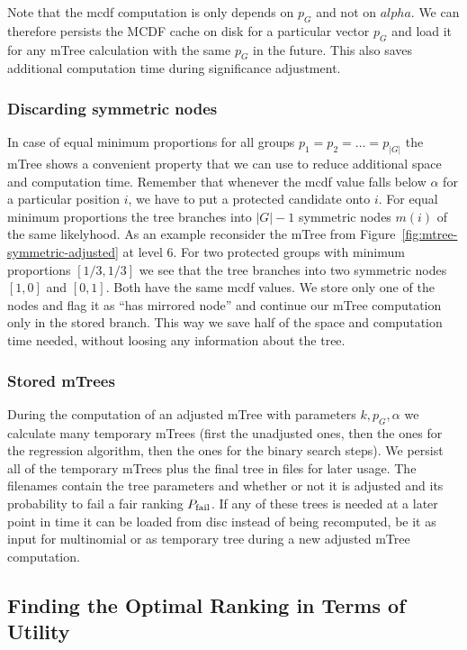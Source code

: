 Note that the mcdf computation is only depends on $p_G$ and not on $alpha$. 
%
We can therefore persists the MCDF cache on disk for a particular vector $p_G$ and load it for any mTree calculation with the same $p_G$ in the future.
%
This also saves additional computation time during significance adjustment.

\subsubsection{Discarding symmetric nodes}
\label{subsubsec:discarding-symmetric-nodes}
In case of equal minimum proportions for all groups $p_1 = p_2 = \ldots = p_|G|$ the mTree shows a convenient property that we can use to reduce additional space and computation time. 
%
Remember that whenever the mcdf value falls below $\alpha$ for a particular position $i$, we have to put a protected candidate onto $i$. 
%
For equal minimum proportions the tree branches into $|G| - 1$ symmetric nodes $m(i)$ of the same likelyhood.
%
As an example reconsider the mTree from Figure~\ref{fig:mtree-symmetric-adjusted} at level 6. 
%
For two protected groups with minimum proportions $[1/3, 1/3]$ we see that the tree branches into two symmetric nodes $[1, 0]$ and $[0,1]$. 
%
Both have the same mcdf values.
%
We store only one of the nodes and flag it as ``has mirrored node'' and continue our mTree computation only in the stored branch.
%
This way we save half of the space and computation time needed, without loosing any information about the tree. 

\subsubsection{Stored mTrees}
\label{subsubsec:stored-mtrees}
During the computation of an adjusted mTree with parameters $k,p_G , \alpha$ we calculate many temporary mTrees (first the unadjusted ones, then the ones for the regression algorithm, then the ones for the binary search steps).
%
We persist all of the temporary mTrees plus the final tree in files for later usage.
%
The filenames contain the tree parameters and whether or not it is adjusted and its probability to fail a fair ranking $P_{\operatorname{fail}}$.
%
If any of these trees is needed at a later point in time it can be loaded from disc instead of being recomputed, be it as input for multinomial \algoFAIR or as temporary tree during a new adjusted mTree computation.

\subsection{Finding the Optimal Ranking in Terms of Utility}\label{subsec:optimal-utility-extension}

